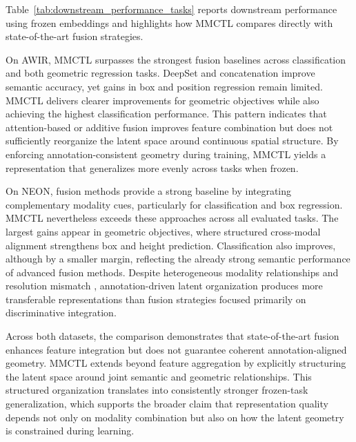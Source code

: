 \documentclass[lettersize,journal]{IEEEtran}
\begin{document}
Table~\ref{tab:downstream_performance_tasks} reports downstream performance using frozen embeddings and highlights how MMCTL compares directly with state-of-the-art fusion strategies.

On AWIR, MMCTL surpasses the strongest fusion baselines across classification and both geometric regression tasks. DeepSet and concatenation improve semantic accuracy, yet gains in box and position regression remain limited. MMCTL delivers clearer improvements for geometric objectives while also achieving the highest classification performance. This pattern indicates that attention-based or additive fusion improves feature combination but does not sufficiently reorganize the latent space around continuous spatial structure. By enforcing annotation-consistent geometry during training, MMCTL yields a representation that generalizes more evenly across tasks when frozen.

On NEON, fusion methods provide a strong baseline by integrating complementary modality cues, particularly for classification and box regression. MMCTL nevertheless exceeds these approaches across all evaluated tasks. The largest gains appear in geometric objectives, where structured cross-modal alignment strengthens box and height prediction. Classification also improves, although by a smaller margin, reflecting the already strong semantic performance of advanced fusion methods. Despite heterogeneous modality relationships and resolution mismatch \cite{du2019multiresolution}, annotation-driven latent organization produces more transferable representations than fusion strategies focused primarily on discriminative integration.

Across both datasets, the comparison demonstrates that state-of-the-art fusion enhances feature integration but does not guarantee coherent annotation-aligned geometry. MMCTL extends beyond feature aggregation by explicitly structuring the latent space around joint semantic and geometric relationships. This structured organization translates into consistently stronger frozen-task generalization, which supports the broader claim that representation quality depends not only on modality combination but also on how the latent geometry is constrained during learning.
\end{document}
